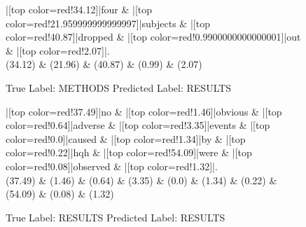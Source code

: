 \documentclass[a4paper, landscape]{article}
\begin{document}
\clearpage
\begin{figure}
\begin{center}
\begin{dependency}
\begin{deptext}
|[top color=red!34.12]|four \& |[top color=red!21.959999999999997]|subjects \& |[top color=red!40.87]|dropped \& |[top color=red!0.9900000000000001]|out \& |[top color=red!2.07]|.\\
(34.12) \& (21.96) \& (40.87) \& (0.99) \& (2.07)\\
\end{deptext}
\end{dependency}
\end{center}
\caption{True Label: METHODS Predicted Label: RESULTS}
\end{figure}
\clearpage
\begin{figure}
\begin{center}
\begin{dependency}
\begin{deptext}
|[top color=red!37.49]|no \& |[top color=red!1.46]|obvious \& |[top color=red!0.64]|adverse \& |[top color=red!3.35]|events \& |[top color=red!0.0]|caused \& |[top color=red!1.34]|by \& |[top color=red!0.22]|hqh \& |[top color=red!54.09]|were \& |[top color=red!0.08]|observed \& |[top color=red!1.32]|.\\
(37.49) \& (1.46) \& (0.64) \& (3.35) \& (0.0) \& (1.34) \& (0.22) \& (54.09) \& (0.08) \& (1.32)\\
\end{deptext}
\end{dependency}
\end{center}
\caption{True Label: RESULTS Predicted Label: RESULTS}
\end{figure}
\clearpage
\end{document}
